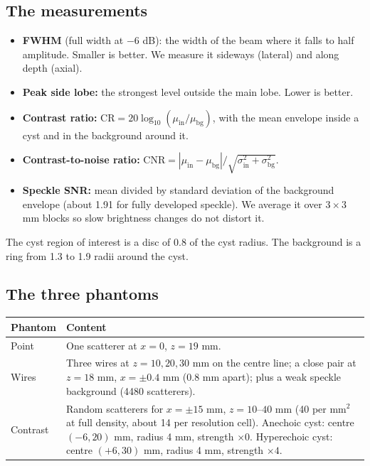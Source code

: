 \documentclass[11pt,a4paper]{article}
\begin{document}
\subsection{The measurements}
\begin{itemize}
\item \textbf{FWHM} (full width at $-6$ dB): the width of the beam where it falls to half amplitude. Smaller is better. We measure it sideways (lateral) and along depth (axial).
\item \textbf{Peak side lobe:} the strongest level outside the main lobe. Lower is better.
\item \textbf{Contrast ratio:} $\mathrm{CR} = 20\log_{10}(\mu_{\text{in}}/\mu_{\text{bg}})$, with the mean envelope inside a cyst and in the background around it.
\item \textbf{Contrast-to-noise ratio:} $\mathrm{CNR} = |\mu_{\text{in}}-\mu_{\text{bg}}|/\sqrt{\sigma_{\text{in}}^2+\sigma_{\text{bg}}^2}$.
\item \textbf{Speckle SNR:} mean divided by standard deviation of the background envelope (about 1.91 for fully developed speckle). We average it over $3\times3$ mm blocks so slow brightness changes do not distort it.
\end{itemize}
The cyst region of interest is a disc of 0.8 of the cyst radius. The background is a ring from 1.3 to 1.9 radii around the cyst.

\subsection{The three phantoms}
\begin{center}
\begin{tabular}{@{}p{2.4cm}p{12.1cm}@{}}
\toprule
\textbf{Phantom} & \textbf{Content}\\
\midrule
Point & One scatterer at $x=0$, $z=19$ mm.\\
Wires & Three wires at $z = 10, 20, 30$ mm on the centre line; a close pair at $z=18$ mm, $x=\pm0.4$ mm (0.8 mm apart); plus a weak speckle background (4480 scatterers).\\
Contrast & Random scatterers for $x=\pm15$ mm, $z=10$--$40$ mm (40 per mm$^2$ at full density, about 14 per resolution cell). Anechoic cyst: centre $(-6, 20)$ mm, radius 4 mm, strength $\times0$. Hyperechoic cyst: centre $(+6, 30)$ mm, radius 4 mm, strength $\times4$.\\
\bottomrule
\end{tabular}
\end{center}
\end{document}
